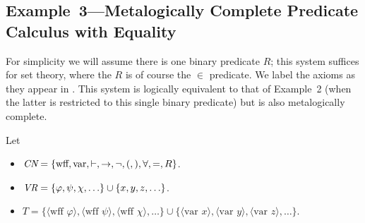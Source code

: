 \begin{sloppy}
\subsection{Example~3---Metalogically Complete Predicate
Calculus with
Equality}
\end{sloppy}

For simplicity we will assume there is one binary predicate $R$;
this system suffices for set theory, where the $R$ is of course the $\in$
predicate.  We label the axioms as they appear in \cite{Megill}.  This
system is logically equivalent to that of Example~2 (when the latter is
restricted to this single binary predicate) but is also metalogically
complete.

Let
\begin{itemize}
  \item[] $\mbox{\em CN}=\{\mbox{wff}, \mbox{var}, \vdash, \to, \lnot, (,),\forall,=,R\}$.
  \item[] $\mbox{\em VR}=\{\varphi,\psi,\chi,\ldots\}\cup\{x,y,z,\ldots\}$.
  \item[] $T = \{\langle \mbox{wff\ } \varphi\rangle,
             \langle \mbox{wff\ } \psi\rangle,
             \langle \mbox{wff\ } \chi\rangle,\ldots\}\cup
       \{\langle \mbox{var\ } x\rangle, \langle \mbox{var\ } y\rangle, \langle
       \mbox{var\ }z\rangle,\ldots\}$.


\end{itemize}
